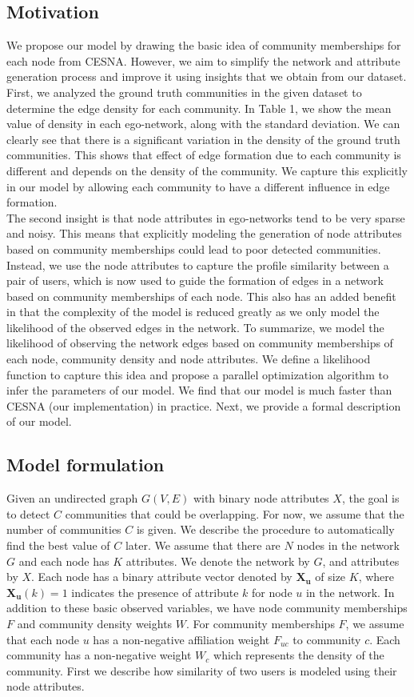 \documentclass[11pt]{article}
\begin{document}
\subsection{Motivation}
We propose our model by drawing the basic idea of community memberships for each node from CESNA. However, we aim to simplify the network and attribute generation process and improve it using insights that we obtain from our dataset. First, we analyzed the ground truth communities in the given dataset to determine the edge density for each community. In Table 1, we show the mean value of density in each ego-network, along with the standard deviation. We can clearly see that there is a significant variation in the density of the ground truth communities. This shows that effect of edge formation due to each community is different and depends on the density of the community. We capture this explicitly in our model by allowing each community to have a different influence in edge formation.  \\[3pt]

The second insight is that node attributes in ego-networks tend to be very sparse and noisy. This means that explicitly modeling the generation of node attributes based on community memberships could lead to poor detected communities. Instead, we use the node attributes to capture the profile similarity between a pair of users, which is now used to guide the formation of edges in a network based on community memberships of each node. This also has an added benefit in that the complexity of the model is reduced greatly as we only model the likelihood of the observed edges in the network. To summarize, we model the likelihood of observing the network edges based on community memberships of each node, community density and node attributes. We define a likelihood function to capture this idea and propose a parallel optimization algorithm to infer the parameters of our model. We find that our model is much faster than CESNA (our implementation) in practice.
Next, we provide a formal description of our model. 

\subsection{Model formulation}
Given an undirected graph $G(V,E)$ with binary node attributes $X$,  the goal is to detect $C$ communities that could be overlapping. For now, we assume that the number of communities $C$ is given.  We describe the procedure to automatically find the best value of $C$ later.
We assume that there are $N$ nodes in the network $G$ and each node has $K$ attributes. We denote the network by $G$, and attributes by $X$.
Each node has a binary attribute vector denoted by $\mathbf{X_u}$ of size $K$,  
where $\mathbf{X_u} (k) = 1$ indicates the presence of attribute $k$ for node $u$ in the network. In addition to these basic observed variables, we have node community memberships $F$ and community density weights $W$. For community memberships $F$, we assume that each node $u$ has a non-negative affiliation weight $F_{uc}$ to community $c$. Each community has a non-negative weight $W_c$ which represents the density of the community. First we describe how similarity of two users is modeled using their node attributes. 
\end{document}
